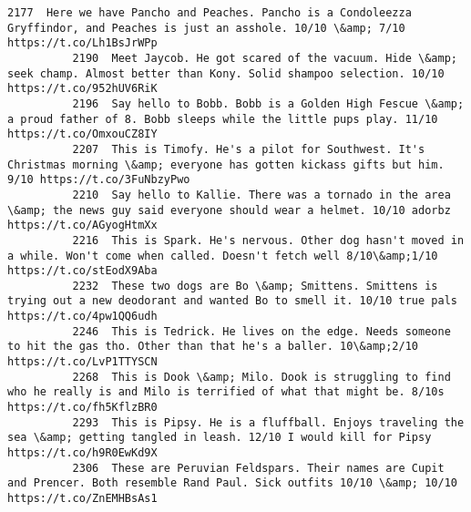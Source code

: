 \documentclass[11pt]{article}
\begin{document}
\begin{Verbatim}[commandchars=\\\{\}]
          2177  Here we have Pancho and Peaches. Pancho is a Condoleezza Gryffindor, and Peaches is just an asshole. 10/10 \&amp; 7/10 https://t.co/Lh1BsJrWPp                               
          2190  Meet Jaycob. He got scared of the vacuum. Hide \&amp; seek champ. Almost better than Kony. Solid shampoo selection. 10/10 https://t.co/952hUV6RiK                            
          2196  Say hello to Bobb. Bobb is a Golden High Fescue \&amp; a proud father of 8. Bobb sleeps while the little pups play. 11/10 https://t.co/OmxouCZ8IY                            
          2207  This is Timofy. He's a pilot for Southwest. It's Christmas morning \&amp; everyone has gotten kickass gifts but him. 9/10 https://t.co/3FuNbzyPwo                            
          2210  Say hello to Kallie. There was a tornado in the area \&amp; the news guy said everyone should wear a helmet. 10/10 adorbz https://t.co/AGyogHtmXx                            
          2216  This is Spark. He's nervous. Other dog hasn't moved in a while. Won't come when called. Doesn't fetch well 8/10\&amp;1/10 https://t.co/stEodX9Aba                            
          2232  These two dogs are Bo \&amp; Smittens. Smittens is trying out a new deodorant and wanted Bo to smell it. 10/10 true pals https://t.co/4pw1QQ6udh                             
          2246  This is Tedrick. He lives on the edge. Needs someone to hit the gas tho. Other than that he's a baller. 10\&amp;2/10 https://t.co/LvP1TTYSCN                                 
          2268  This is Dook \&amp; Milo. Dook is struggling to find who he really is and Milo is terrified of what that might be. 8/10s https://t.co/fh5KflzBR0                             
          2293  This is Pipsy. He is a fluffball. Enjoys traveling the sea \&amp; getting tangled in leash. 12/10 I would kill for Pipsy https://t.co/h9R0EwKd9X                             
          2306  These are Peruvian Feldspars. Their names are Cupit and Prencer. Both resemble Rand Paul. Sick outfits 10/10 \&amp; 10/10 https://t.co/ZnEMHBsAs1                            
          

\end{Verbatim}
\end{document}

